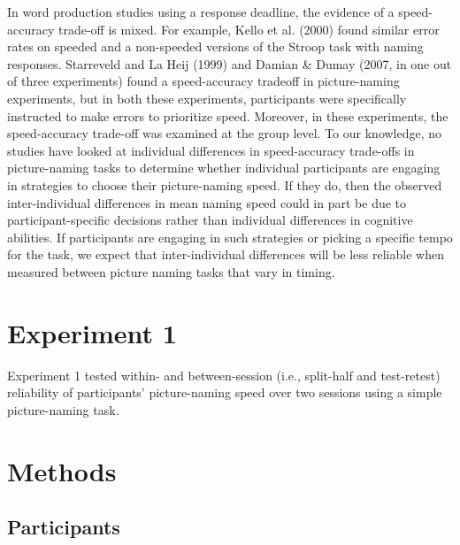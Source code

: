 \documentclass[
  man,floatsintext]{apa6}
\begin{document}
In word production studies using a response deadline, the evidence of a speed-accuracy trade-off is mixed. For example, Kello et al. (2000) found similar error rates on speeded and a non-speeded versions of the Stroop task with naming responses. Starreveld and La Heij (1999) and Damian \& Dumay (2007, in one out of three experiments) found a speed-accuracy tradeoff in picture-naming experiments, but in both these experiments, participants were specifically instructed to make errors to prioritize speed. Moreover, in these experiments, the speed-accuracy trade-off was examined at the group level. To our knowledge, no studies have looked at individual differences in speed-accuracy trade-offs in picture-naming tasks to determine whether individual participants are engaging in strategies to choose their picture-naming speed. If they do, then the observed inter-individual differences in mean naming speed could in part be due to participant-specific decisions rather than individual differences in cognitive abilities. If participants are engaging in such strategies or picking a specific tempo for the task, we expect that inter-individual differences will be less reliable when measured between picture naming tasks that vary in timing.

\hypertarget{experiment-1}{%
\section{Experiment 1}\label{experiment-1}}

Experiment 1 tested within- and between-session (i.e., split-half and test-retest) reliability of participants' picture-naming speed over two sessions using a simple picture-naming task.

\hypertarget{methods}{%
\section{Methods}\label{methods}}

\hypertarget{participants}{%
\subsection{Participants}\label{participants}}
\end{document}
